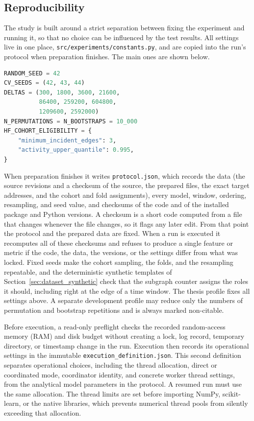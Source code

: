 \documentclass{thesisclass}
\begin{document}
\subsection{Reproducibility}

The study is built around a strict separation between fixing the experiment and
running it, so that no choice can be influenced by the test results. All settings live
in one place, \texttt{src/experiments/constants.py}, and are copied into the run's
protocol when preparation finishes. The main ones are shown below.

\begin{lstlisting}[language=Python,
  caption={Selected fixed experiment settings.},
  label={lst:config}]
RANDOM_SEED = 42
CV_SEEDS = (42, 43, 44)
DELTAS = (300, 1800, 3600, 21600,
          86400, 259200, 604800,
          1209600, 2592000)
N_PERMUTATIONS = N_BOOTSTRAPS = 10_000
HF_COHORT_ELIGIBILITY = {
    "minimum_incident_edges": 3,
    "activity_upper_quantile": 0.995,
}
\end{lstlisting}

When preparation finishes it writes \texttt{protocol.json}, which records the data
(the source revisions and a checksum of the source, the prepared files, the exact
target addresses, and the cohort and fold assignments), every model, window,
ordering, resampling, and seed value, and checksums of the code and of the
installed package and Python versions. A checksum is a short code computed from a
file that changes whenever the file changes, so it flags any later edit. From that
point the protocol and the prepared data are fixed. When a run is executed it
recomputes all of these checksums and refuses to produce a single feature or metric
if the code, the data, the versions, or the settings differ from what was locked. Fixed seeds make
the cohort sampling, the folds, and the resampling repeatable, and the
deterministic synthetic templates of Section~\ref{sec:dataset_synthetic} check that
the subgraph counter assigns the roles it should, including right at the edge of a
time window. The thesis profile fixes all settings above. A separate development
profile may reduce only the numbers of permutation and bootstrap repetitions and
is always marked non-citable.

Before execution, a read-only preflight checks the recorded random-access memory
(RAM) and disk budget
without creating a lock, log record, temporary directory, or timestamp change in
the run. Execution then records its operational settings in the immutable
\texttt{execution\_\allowbreak definition.json}. This second definition separates operational
choices, including the thread allocation, direct or coordinated mode, coordinator
identity, and concrete worker thread settings, from the analytical model
parameters in the protocol. A resumed run must use the same allocation. The
thread limits are set before importing NumPy, scikit-learn, or the native
libraries, which prevents numerical thread pools from silently exceeding that
allocation.
\end{document}
